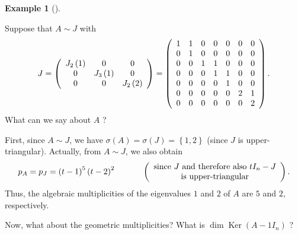 \documentclass[numbers=enddot,12pt,final,onecolumn,notitlepage]{scrartcl}%
\numberwithin{exer}{subsection}
\theoremstyle{definition}
\newtheorem{exam}[theo]{Example}
\newenvironment{example}[1][]
{\begin{exam}[#1]\begin{leftbar}}
{\end{leftbar}\end{exam}}
\begin{document}
\begin{example}
Suppose that $A\sim J$ with%
\[
J=\left(
\begin{array}
[c]{ccc}%
J_{2}\left(  1\right)   & 0 & 0\\
0 & J_{3}\left(  1\right)   & 0\\
0 & 0 & J_{2}\left(  2\right)
\end{array}
\right)  =\left(
\begin{array}
[c]{ccccccc}%
1 & 1 & 0 & 0 & 0 & 0 & 0\\
0 & 1 & 0 & 0 & 0 & 0 & 0\\
0 & 0 & 1 & 1 & 0 & 0 & 0\\
0 & 0 & 0 & 1 & 1 & 0 & 0\\
0 & 0 & 0 & 0 & 1 & 0 & 0\\
0 & 0 & 0 & 0 & 0 & 2 & 1\\
0 & 0 & 0 & 0 & 0 & 0 & 2
\end{array}
\right)  .
\]
What can we say about $A$ ?

First, since $A\sim J$, we have $\sigma\left(  A\right)  =\sigma\left(
J\right)  =\left\{  1,2\right\}  $ (since $J$ is upper-triangular). Actually,
from $A\sim J$, we also obtain%
\[
p_{A}=p_{J}=\left(  t-1\right)  ^{5}\left(  t-2\right)  ^{2}%
\ \ \ \ \ \ \ \ \ \ \left(
\begin{array}
[c]{c}%
\text{since }J\text{ and therefore also }tI_{n}-J\\
\text{is upper-triangular}%
\end{array}
\right)  .
\]
Thus, the algebraic multiplicities of the eigenvalues $1$ and $2$ of $A$ are
$5$ and $2$, respectively.

Now, what about the geometric multiplicities? What is $\dim\operatorname*{Ker}%
\left(  A-1I_{n}\right)  $ ?


\end{example}
\end{document}
